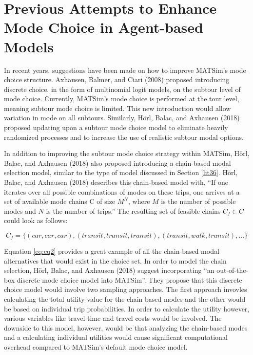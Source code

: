 \documentclass[12pt, oneside, openright]{byuthesis}
\begin{document}
\hypertarget{lit8}{%
\section{Previous Attempts to Enhance Mode Choice in Agent-based Models}\label{lit8}}

In recent years, suggestions have been made on how to improve MATSim's mode choice structure. Axhausen, Balmer, and Ciari (2008) proposed introducing discrete choice, in the form of multinomial logit models, on the subtour level of mode choice. Currently, MATSim's mode choice is performed at the tour level, meaning subtour mode choice is limited. This new introduction would allow variation in mode on all subtours. Similarly, Hörl, Balac, and Axhausen (2018) proposed updating upon a subtour mode choice model to eliminate heavily randomized processes and to increase the use of realistic subtour modal options.

In addition to improving the subtour mode choice strategy within MATSim, Hörl, Balac, and Axhausen (2018) also proposed introducing a chain-based modal selection model, similar to the type of model discussed in Section \ref{lit36}. Hörl, Balac, and Axhausen (2018) describes this chain-based model with, ``If one iterates over all possible combinations of modes on these trips, one arrives at a set of available mode chains C of size \(M^{N}\), where \(M\) is the number of possible modes and \(N\) is the number of trips.'' The resulting set of feasible chains \(C_f \in C\) could look as follows:

\begin{equation} 
  C_f = \{(car,car,car),(transit,transit,transit),(transit,walk,transit),...\}
  \label{eq:eq2}
\end{equation}

Equation \eqref{eq:eq2} provides a great example of all the chain-based modal alternatives that would exist in the choice set. In order to model the chain selection, Hörl, Balac, and Axhausen (2018) suggest incorporating ``an out-of-the-box discrete mode choice model into MATSim''. They propose that this discrete choice model would involve two sampling approaches. The first approach invovles calculating the total utility value for the chain-based modes and the other would be based on individual trip probabilities. In order to calculate the utility however, various variables like travel time and travel costs would be involved. The downside to this model, however, would be that analyzing the chain-based modes and a calculating individual utilities would cause significant computational overhead compared to MATSim's default mode choice model.
\end{document}
